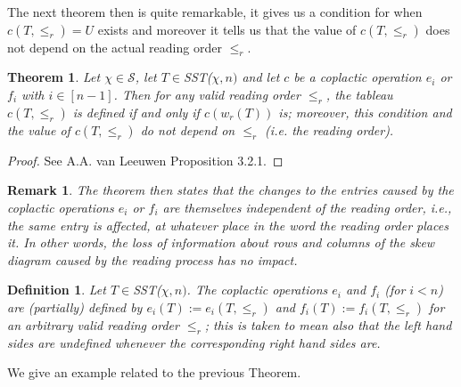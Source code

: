 \documentclass{article}
\newtheorem{thm}{Theorem}
\newtheorem{defn}{Definition}
\newtheorem{rem}{Remark}
\begin{document}
The next theorem then is quite remarkable, it gives us a condition for when $c(T, \leq_r)= U$ exists and moreover it tells us that the value of $c(T, \leq_r)$ does not depend on the actual reading order $\leq_r$.
\begin{thm}
Let $\chi \in \mathcal{S}$, let $T \in $SST($\chi,n)$ and let $c$ be a coplactic operation $e_i$ or $f_i$ with $i \in [n-1]$. Then for any valid reading order $\leq_r$, the tableau $c(T, \leq_r)$ is defined if and only if $c(w_r(T))$ is; moreover, this condition and the value of $c(T, \leq_r)$ do not depend on $\leq_r$ (i.e. the reading order). 
\end{thm}
\begin{proof}
See  A.A. van Leeuwen Proposition 3.2.1.
\end{proof}
\begin{rem}
The theorem then states that the changes to the entries caused by the coplactic operations $e_i$ or $f_i$ are themselves independent of the reading order, i.e., the same entry is affected, at whatever place in the word the reading order places it. In other words, the loss of information about rows and columns of the skew diagram caused by the reading process has no impact. 
\end{rem}
\begin{defn}
Let $T \in $SST($\chi,n)$. The coplactic operations $e_i$ and $f_i$ (for $i < n$) are (partially) defined by $e_i(T):= e_i(T, \leq_r)$ and $f_i(T):= f_i(T, \leq_r)$ for an arbitrary valid reading order $\leq_r$; this is taken to mean also that the left hand sides are undefined whenever the corresponding right hand sides are. 
\end{defn}
We give an example related to the previous Theorem. 
\end{document}
